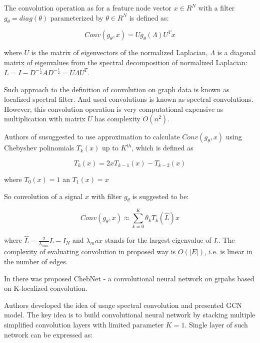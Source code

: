 The convolution operation  as for a feature node vector $x \in R^N$ with a
filter $g_\theta = diag(\theta)$ parameterized by $\theta \in R^N$ is defined as:


\begin{equation}
    Conv(g_\theta,x) = Ug_\theta(\Lambda)U^{T}x
    \label{eq:simple_conv}
 \end{equation}


where $U$ is the matrix of eigenvectors of the normalized Laplacian, $\Lambda$ is a diagonal matrix of 
eigenvalues from the spectral decomposition of normalized Laplacian: $L = I - D^{-\frac{1}{2}}AD^{-\frac{1}{2}} = U\Lambda U^{T}$.

Such approach to the definition of convolution on graph data is known as localized spectral filter. And used convolutions is known as 
spectral convolutions.
However, this convolution operation is very computational expensive as multiplication with matrix $U$ has complexity $O(n^2)$.


Authors of \cite{ChebAppr} susuggested to use approximation to calculate 
$Conv(g_\theta,x)$ using Chebyshev polinomials $T_k(x)$ up to $K^{th}$, which is defined as 

\begin{equation}
    T_k (x) = 2xT_{k-1}(x) - T_{k-2}(x)
    \label{eq:cheb_polynom}
 \end{equation}


where $T_0(x)=1$ an $T_1(x)=x$

So convolution of a signal $x$ with filter $g_\theta$ is suggested to be:

\begin{equation}
    Conv(g_\theta,x) \approx \sum_{k=0}^{K}{\theta}_k T_k(\hat{L})x
    \label{eq:conv_appr}
 \end{equation}

where $\hat{L} = \frac{2}{\lambda_{max}}L-I_N$ and $\lambda_max$ 
stands for the largest eigenvalue of $L$.
The complexity of evaluating convolution in proposed way is $O(|E|)$, i.e. is linear in the number of edges.

In \cite{ChebNet} there was proposed ChebNet - a convolutional neural network on grpahs based on K-localized convolution.

Authors \cite{GCN} developed the idea of usage spectral convolution and presented GCN model. The key idea is to build
convolutional neural network by stacking multiple simplified convolution layers with limited parameter $K=1$.
Single layer of such network can be expressed as: 

